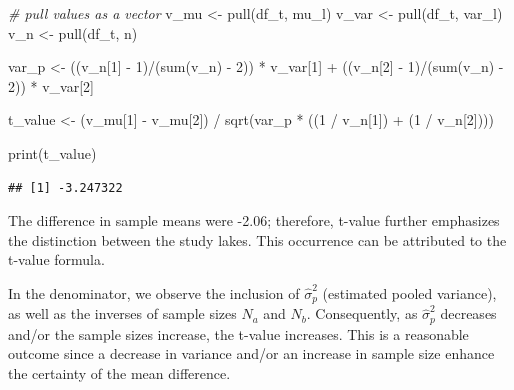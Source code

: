 \documentclass[
]{book}
\newenvironment{Shaded}{\begin{snugshade}}{\end{snugshade}}
\newcommand{\CommentTok}[1]{\textcolor[rgb]{0.56,0.35,0.01}{\textit{#1}}}
\newcommand{\DecValTok}[1]{\textcolor[rgb]{0.00,0.00,0.81}{#1}}
\newcommand{\FunctionTok}[1]{\textcolor[rgb]{0.00,0.00,0.00}{#1}}
\newcommand{\NormalTok}[1]{#1}
\newcommand{\OtherTok}[1]{\textcolor[rgb]{0.56,0.35,0.01}{#1}}
\newcommand{\SpecialCharTok}[1]{\textcolor[rgb]{0.00,0.00,0.00}{#1}}
\begin{document}
\begin{Shaded}
\begin{Highlighting}[]
\CommentTok{\# pull values as a vector}
\NormalTok{v\_mu }\OtherTok{\textless{}{-}} \FunctionTok{pull}\NormalTok{(df\_t, mu\_l)}
\NormalTok{v\_var }\OtherTok{\textless{}{-}} \FunctionTok{pull}\NormalTok{(df\_t, var\_l)}
\NormalTok{v\_n }\OtherTok{\textless{}{-}} \FunctionTok{pull}\NormalTok{(df\_t, n)}

\NormalTok{var\_p }\OtherTok{\textless{}{-}}\NormalTok{ ((v\_n[}\DecValTok{1}\NormalTok{] }\SpecialCharTok{{-}} \DecValTok{1}\NormalTok{)}\SpecialCharTok{/}\NormalTok{(}\FunctionTok{sum}\NormalTok{(v\_n) }\SpecialCharTok{{-}} \DecValTok{2}\NormalTok{)) }\SpecialCharTok{*}\NormalTok{ v\_var[}\DecValTok{1}\NormalTok{] }\SpecialCharTok{+}
\NormalTok{  ((v\_n[}\DecValTok{2}\NormalTok{] }\SpecialCharTok{{-}} \DecValTok{1}\NormalTok{)}\SpecialCharTok{/}\NormalTok{(}\FunctionTok{sum}\NormalTok{(v\_n) }\SpecialCharTok{{-}} \DecValTok{2}\NormalTok{)) }\SpecialCharTok{*}\NormalTok{ v\_var[}\DecValTok{2}\NormalTok{]}

\NormalTok{t\_value }\OtherTok{\textless{}{-}}\NormalTok{ (v\_mu[}\DecValTok{1}\NormalTok{] }\SpecialCharTok{{-}}\NormalTok{ v\_mu[}\DecValTok{2}\NormalTok{]) }\SpecialCharTok{/} \FunctionTok{sqrt}\NormalTok{(var\_p }\SpecialCharTok{*}\NormalTok{ ((}\DecValTok{1} \SpecialCharTok{/}\NormalTok{ v\_n[}\DecValTok{1}\NormalTok{]) }\SpecialCharTok{+}\NormalTok{ (}\DecValTok{1} \SpecialCharTok{/}\NormalTok{ v\_n[}\DecValTok{2}\NormalTok{])))}

\FunctionTok{print}\NormalTok{(t\_value)}
\end{Highlighting}
\end{Shaded}

\begin{verbatim}
## [1] -3.247322
\end{verbatim}

The difference in sample means were -2.06; therefore, t-value further emphasizes the distinction between the study lakes. This occurrence can be attributed to the t-value formula.

In the denominator, we observe the inclusion of \(\hat{\sigma}^2_p\) (estimated pooled variance), as well as the inverses of sample sizes \(N_a\) and \(N_b\). Consequently, as \(\hat{\sigma}^2_p\) decreases and/or the sample sizes increase, the t-value increases. This is a reasonable outcome since a decrease in variance and/or an increase in sample size enhance the certainty of the mean difference.
\end{document}

